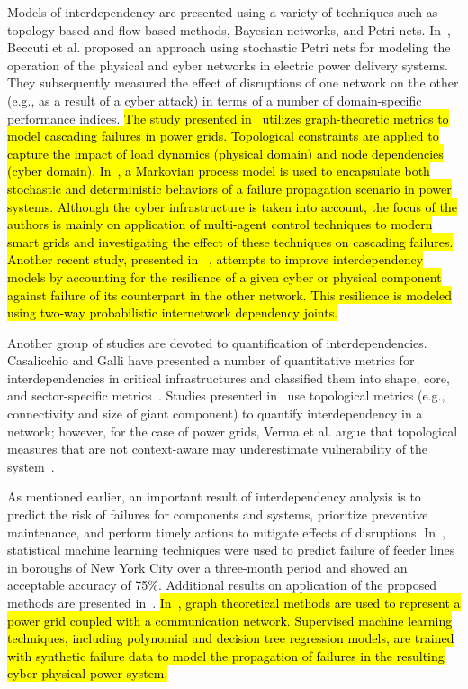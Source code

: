 \documentclass[12pt]{elsarticle}
\begin{document}
Models of interdependency are presented using a variety of techniques such as topology-based and flow-based methods, Bayesian networks, and Petri nets. In~\cite{BeC12}, Beccuti et al. proposed an approach using stochastic Petri nets for modeling the operation of the physical and cyber networks in electric power delivery systems. They subsequently measured the effect of disruptions of one network on the other (e.g., as a result of a cyber attack) in terms of a number of domain-specific performance indices. \hl{The study presented in~\cite{ZhH18} utilizes graph-theoretic metrics to model cascading failures in power grids.  Topological constraints are applied to capture the impact of  load dynamics (physical domain) and node dependencies (cyber domain).   In~\cite{GuY19}, a Markovian process model is used to encapsulate both stochastic and deterministic behaviors of a failure propagation scenario in power systems. Although the cyber infrastructure is taken into account, the focus of the authors is mainly on  application of multi-agent control techniques to modern smart grids and investigating the effect of these techniques on cascading failures. Another recent study, presented in ~\cite{TuX19}, attempts to improve interdependency models by accounting for the resilience of a given cyber or physical component against failure of its counterpart in the other network. This resilience is modeled using two-way probabilistic internetwork dependency joints.}

Another group of studies are devoted to quantification of interdependencies. Casalicchio and Galli have presented a number of quantitative metrics for interdependencies in critical infrastructures and classified them into shape, core, and sector-specific metrics~\cite{CaG08}. Studies presented in~\cite{HuW15a,ZhG13} use topological metrics (e.g., connectivity and size of giant component) to quantify interdependency in a network; however, for the case of power grids, Verma et al. argue that topological measures that are not context-aware may underestimate vulnerability of the system~\cite{VeE15}.

As mentioned earlier, an important result of interdependency analysis is to predict the risk of failures for components and systems, prioritize preventive maintenance, and perform timely actions to mitigate effects of disruptions. In~\cite{GrB06}, statistical machine learning techniques were used to predict failure of feeder lines in boroughs of New York City over a three-month period and showed an acceptable accuracy of 75\%. Additional results on application of the proposed methods are presented in~\cite{RuW12}. \hl{ In~\cite{StS20}, graph theoretical methods are used to represent a power grid coupled with a communication network.  Supervised machine learning techniques, including polynomial and decision tree regression models, are trained with synthetic failure data to model the propagation of failures in the resulting cyber-physical power system.}
\end{document}
